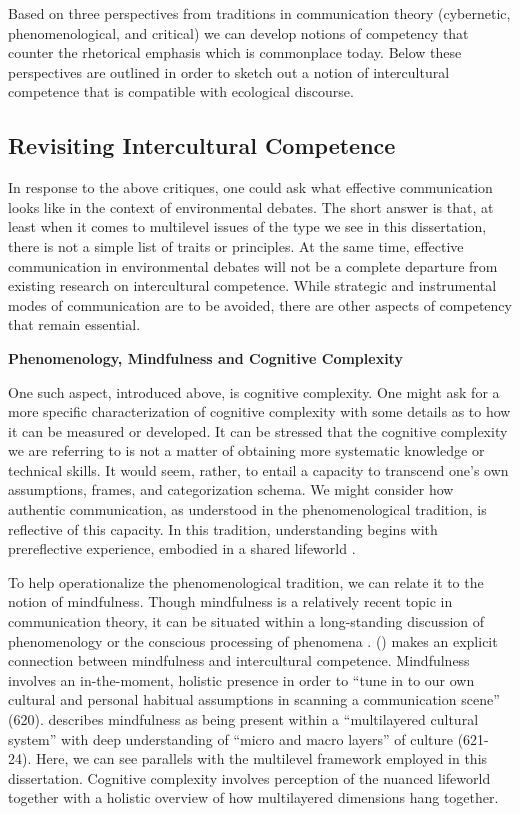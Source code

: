 Based on three perspectives from traditions in communication theory (cybernetic, phenomenological, and critical) we can develop notions of competency that counter the rhetorical emphasis which is commonplace today. Below these perspectives are outlined in order to sketch out a notion of intercultural competence that is compatible with ecological discourse.

\subsection{Revisiting Intercultural Competence}

In response to the above critiques, one could ask what effective communication looks like in the context of environmental debates. The short answer is that, at least when it comes to multilevel issues of the type we see in this dissertation, there is not a simple list of traits or principles. At the same time, effective communication in environmental debates will not be a complete departure from existing research on intercultural competence. While strategic and instrumental modes of communication are to be avoided, there are other aspects of competency that remain essential.

\textbf{Phenomenology, Mindfulness and Cognitive Complexity}

One such aspect, introduced above, is cognitive complexity. One might ask for a more specific characterization of cognitive complexity with some details as to how it can be measured or developed. It can be stressed that the cognitive complexity we are referring to is not a matter of obtaining more systematic knowledge or technical skills. It would seem, rather, to entail a capacity to transcend one's own assumptions, frames, and categorization schema. We might consider how authentic communication, as understood in the phenomenological tradition, is reflective of this capacity. In this tradition, understanding begins with prereflective experience, embodied in a shared lifeworld \cite[138]{Craig1999a}. 

To help operationalize the phenomenological tradition, we can relate it to the notion of mindfulness. Though mindfulness is a relatively recent topic in communication theory, it can be situated within a long-standing discussion of phenomenology or the conscious processing of phenomena \citep{Brown2009}. \citeauthor{Ting-Toomey2015} (\citeyear{Ting-Toomey2015}) makes an explicit connection between mindfulness and intercultural competence. Mindfulness involves an in-the-moment, holistic presence in order to ``tune in to our own cultural and personal habitual assumptions in scanning a communication scene'' (620). \citeauthor{Ting-Toomey2015} describes mindfulness as being present within a ``multilayered cultural system'' with deep understanding of ``micro and macro layers'' of culture (621-24). Here, we can see parallels with the multilevel framework employed in this dissertation. Cognitive complexity involves perception of the nuanced lifeworld together with a holistic overview of how multilayered dimensions hang together. 


